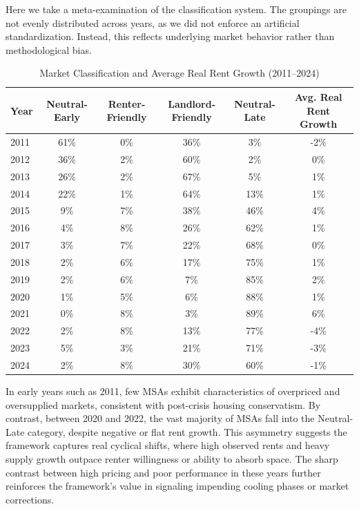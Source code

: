 \documentclass[APA,Times1COL]{WileyNJDv5} %
\begin{document}
Here we take a meta-examination of the classification system. The groupings are not evenly distributed across years, as we did not enforce an artificial standardization. Instead, this reflects underlying market behavior rather than methodological bias. 

\begin{table}[ht]
	\centering
	\caption{Market Classification and Average Real Rent Growth (2011--2024)}
	\label{tab:market_rent_growth}
	\begin{tabular}{lccccc}
		\toprule
		Year & Neutral-Early & Renter-Friendly & Landlord-Friendly & Neutral-Late & Avg. Real Rent Growth \\
		\midrule
		2011 & 61\% & 0\%  & 36\% & 3\%  & -2\% \\
		2012 & 36\% & 2\%  & 60\% & 2\%  & 0\%  \\
		2013 & 26\% & 2\%  & 67\% & 5\%  & 1\%  \\
		2014 & 22\% & 1\%  & 64\% & 13\% & 1\%  \\
		2015 & 9\%  & 7\%  & 38\% & 46\% & 4\%  \\
		2016 & 4\%  & 8\%  & 26\% & 62\% & 1\%  \\
		2017 & 3\%  & 7\%  & 22\% & 68\% & 0\%  \\
		2018 & 2\%  & 6\%  & 17\% & 75\% & 1\%  \\
		2019 & 2\%  & 6\%  & 7\%  & 85\% & 2\%  \\
		2020 & 1\%  & 5\%  & 6\%  & 88\% & 1\%  \\
		2021 & 0\%  & 8\%  & 3\%  & 89\% & 6\%  \\
		2022 & 2\%  & 8\%  & 13\% & 77\% & -4\% \\
		2023 & 5\%  & 3\%  & 21\% & 71\% & -3\% \\
		2024 & 2\%  & 8\%  & 30\% & 60\% & -1\% \\
		\bottomrule
	\end{tabular}
\end{table}


In early years such as 2011, few MSAs exhibit characteristics of overpriced and oversupplied markets, consistent with post-crisis housing conservatism. By contrast, between 2020 and 2022, the vast majority of MSAs fall into the Neutral-Late category, despite negative or flat rent growth. This asymmetry suggests the framework captures real cyclical shifts, where high observed rents and heavy supply growth outpace renter willingness or ability to absorb space. The sharp contrast between high pricing and poor performance in these years further reinforces the framework’s value in signaling impending cooling phases or market corrections.
\end{document}
